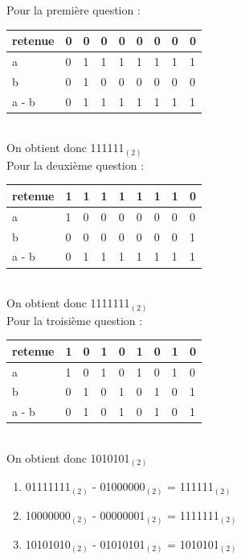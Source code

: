 \begin{Exercice}[15 minutes]
\begin{solution}
Pour la première question : \\
\begin{tabular}{| p{1cm} | p{1cm} | p{1cm} | p{1cm} | p{1cm} | p{1cm} | p{1cm} | p{1cm} | p{1cm} |} 
    \hline
retenue & 0 & 0 & 0 & 0 & 0 & 0 & 0 & 0 \\ [0.5ex]
\hline
    a & 0 & 1 & 1 & 1 & 1 & 1 & 1 & 1 \\ [0.5ex] 
    \hline
    b & 0 & 1 & 0 & 0 & 0 & 0 & 0 & 0 \\ [0.5ex] 
    \hline
    a - b & 0 & 1 & 1 & 1 & 1 & 1 & 1 & 1 \\ [0.5ex]
    \hline
\end{tabular} \\
On obtient donc 111111$_{(2)}$ \\


Pour la deuxième question : \\
\begin{tabular}{| p{1cm} | p{1cm} | p{1cm} | p{1cm} | p{1cm} | p{1cm} | p{1cm} | p{1cm} | p{1cm} |} 
    \hline
retenue & 1 & 1 & 1 & 1 & 1 & 1 & 1 & 0 \\ [0.5ex]
\hline
    a & 1 & 0 & 0 & 0 & 0 & 0 & 0 & 0 \\ [0.5ex] 
    \hline
    b & 0 & 0 & 0 & 0 & 0 & 0 & 0 & 1 \\ [0.5ex] 
    \hline
    a - b & 0 & 1 & 1 & 1 & 1 & 1 & 1 & 1 \\ [0.5ex]
    \hline
\end{tabular} \\
On obtient donc 1111111$_{(2)}$ \\

Pour la troisième question : \\
\begin{tabular}{| p{1cm} | p{1cm} | p{1cm} | p{1cm} | p{1cm} | p{1cm} | p{1cm} | p{1cm} | p{1cm} |} 
    \hline
retenue & 1 & 0 & 1 & 0 & 1 & 0 & 1 & 0 \\ [0.5ex]
\hline
    a & 1 & 0 & 1 & 0 & 1 & 0 & 1 & 0 \\ [0.5ex] 
    \hline
    b & 0 & 1 & 0 & 1 & 0 & 1 & 0 & 1 \\ [0.5ex] 
    \hline
    a - b & 0 & 1 & 0 & 1 & 0 & 1 & 0 & 1 \\ [0.5ex]
    \hline
\end{tabular} \\
On obtient donc 1010101$_{(2)}$ \\
 		
 		\begin{enumerate}
        \item 01111111$_{(2)}$ - 01000000$_{(2)}$ = 111111$_{(2)}$
        \item 10000000$_{(2)}$ - 00000001$_{(2)}$ = 1111111$_{(2)}$
        \item 10101010$_{(2)}$ - 01010101$_{(2)}$ = 1010101$_{(2)}$
    \end{enumerate}
    \end{solution}


\end{Exercice}
